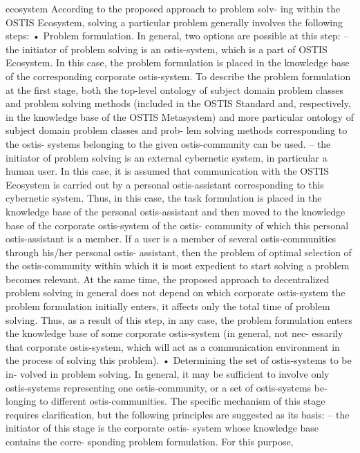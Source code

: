 \documentclass{article}
\begin{document}
ecosystem
According to the proposed approach to problem solv-
ing within the OSTIS Ecosystem, solving a particular
problem generally involves the following steps:
• Problem formulation. In general, two options are
possible at this step:
– the initiator of problem solving is an ostis-system,
which is a part of OSTIS Ecosystem. In this
case, the problem formulation is placed in the
knowledge base of the corresponding corporate
ostis-system. To describe the problem formulation
at the first stage, both the top-level ontology
of subject domain problem classes and problem
solving methods (included in the OSTIS Standard
and, respectively, in the knowledge base of the
OSTIS Metasystem) and more particular ontology
of subject domain problem classes and prob-
lem solving methods corresponding to the ostis-
systems belonging to the given ostis-community
can be used.
– the initiator of problem solving is an external
cybernetic system, in particular a human user. In
this case, it is assumed that communication with
the OSTIS Ecosystem is carried out by a personal
ostis-assistant corresponding to this cybernetic
system. Thus, in this case, the task formulation
is placed in the knowledge base of the personal
ostis-assistant and then moved to the knowledge
base of the corporate ostis-system of the ostis-
community of which this personal ostis-assistant
is a member. If a user is a member of several
ostis-communities through his/her personal ostis-
assistant, then the problem of optimal selection
of the ostis-community within which it is most
expedient to start solving a problem becomes
relevant. At the same time, the proposed approach
to decentralized problem solving in general does
not depend on which corporate ostis-system the
problem formulation initially enters, it affects
only the total time of problem solving.
Thus, as a result of this step, in any case, the
problem formulation enters the knowledge base of
some corporate ostis-system (in general, not nec-
essarily that corporate ostis-system, which will act
as a communication environment in the process of
solving this problem).
• Determining the set of ostis-systems to be in-
volved in problem solving. In general, it may be
sufficient to involve only ostis-systems representing
one ostis-community, or a set of ostis-systems be-
longing to different ostis-communities. The specific
mechanism of this stage requires clarification, but
the following principles are suggested as its basis:
– the initiator of this stage is the corporate ostis-
system whose knowledge base contains the corre-
sponding problem formulation. For this purpose,
\end{document}
